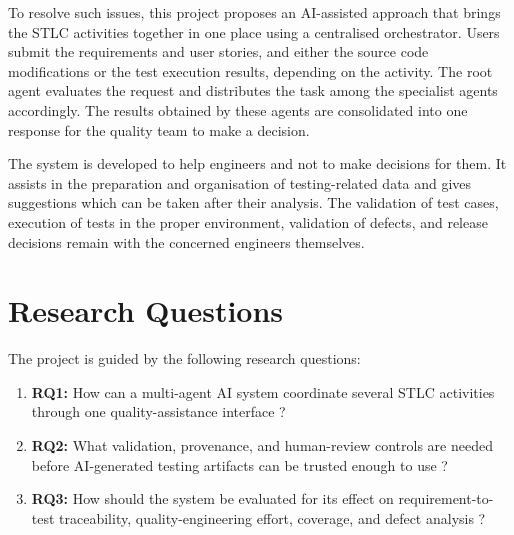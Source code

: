 To resolve such issues, this project proposes an AI-assisted approach that brings the STLC activities together in one place using a centralised orchestrator. Users submit the requirements and user stories, and either the source code modifications or the test execution results, depending on the activity. The root agent evaluates the request and distributes the task among the specialist agents accordingly. The results obtained by these agents are consolidated into one response for the quality team to make a decision.

The system is developed to help engineers and not to make decisions for them. It assists in the preparation and organisation of testing-related data and gives suggestions which can be taken after their analysis. The validation of test cases, execution of tests in the proper environment, validation of defects, and release decisions remain with the concerned engineers themselves.

\clearpage
\section{Research Questions}
The project is guided by the following research questions:
\begin{enumerate}
  \item \textbf{RQ1:} How can a multi-agent AI system coordinate several STLC activities through one quality-assistance interface ?
  \item \textbf{RQ2:} What validation, provenance, and human-review controls are needed before AI-generated testing artifacts can be trusted enough to use ?
  \item \textbf{RQ3:} How should the system be evaluated for its effect on requirement-to-test traceability, quality-engineering effort, coverage, and defect analysis ?
\end{enumerate}

